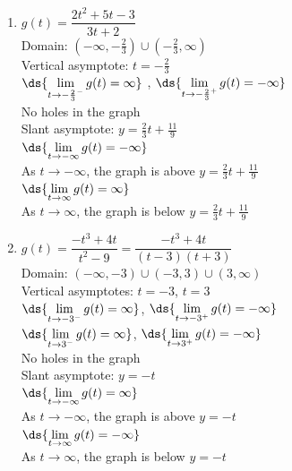 \documentclass{ximera}
\begin{document}
\begin{multicols}{2}
\begin{enumerate}
\setcounter{enumi}{\value{HW}}

\item $g(t) = \dfrac{2t^{2} + 5t - 3}{3t + 2}$\\
Domain: $\left(-\infty, -\frac{2}{3}\right) \cup \left(-\frac{2}{3}, \infty\right)$\\
Vertical asymptote: $t = -\frac{2}{3}$\\
$\ds{\lim_{t \rightarrow -\frac{2}{3}^{-}} g(t)=  \infty}$ , $\ds{\lim_{t \rightarrow -\frac{2}{3}^{+}} g(t)=  -\infty}$ \\
No holes in the graph \\
Slant asymptote:  $y = \frac{2}{3}t + \frac{11}{9}$ \\
$\ds{\lim_{t \rightarrow -\infty} g(t) = -\infty}$\\
As $t \rightarrow  -\infty$, the graph is above \small $y = \frac{2}{3}t + \frac{11}{9}$ \normalsize\\
$\ds{\lim_{t \rightarrow \infty} g(t) = \infty}$\\
 As $t \rightarrow \infty$, the graph is below \small $y = \frac{2}{3}t + \frac{11}{9}$ \normalsize \\

\vfill

\columnbreak

\item $g(t) = \dfrac{-t^{3} + 4t}{t^{2} - 9} = \dfrac{-t^{3} + 4t}{(t-3)(t+3)} $\\
Domain: $(-\infty, -3) \cup (-3, 3) \cup (3, \infty)$\\
Vertical asymptotes: $t = -3$, $t=3$\\
$\ds{\lim_{t \rightarrow -3^{-}} g(t)=  \infty}$, $\ds{\lim_{t \rightarrow -3^{+}} g(t)=  -\infty}$ \\
$\ds{\lim_{t \rightarrow 3^{-}} g(t)=  \infty}$, $\ds{\lim_{t \rightarrow 3^{+}} g(t)=  -\infty}$ \\
No holes in the graph \\
Slant asymptote: $y=-t$ \\
$\ds{\lim_{t \rightarrow -\infty} g(t) = \infty}$\\
As $t \rightarrow -\infty$, the graph is above $y=-t$\\
$\ds{\lim_{t \rightarrow \infty} g(t) = -\infty}$\\
As $t \rightarrow \infty$, the graph is below $y=-t$\\


\setcounter{HW}{\value{enumi}}
\end{enumerate}
\end{multicols}
\end{document}
